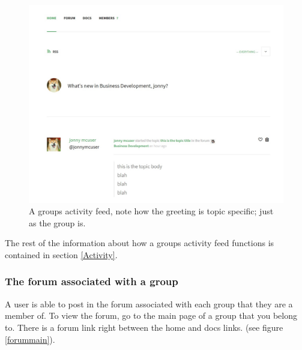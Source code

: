 \documentclass[10pt]{article}
\begin{document}
\begin{figure}[H]
    \centering
    \includegraphics[scale=0.5]{images/groupactivity.jpg}
    \caption{A groups activity feed, note how the greeting is topic specific; just as the group is.}
    \label{groupact}
\end{figure}

\begin{flushleft}
The rest of the information about how a groups activity feed functions is contained in section \ref{Activity}.
\end{flushleft}

\subsubsection{The forum associated with a group} \label{groupforum}

\begin{flushleft}
A user is able to post in the forum associated with each group that they are a member of.  To view the forum, go to the main page of a group that you belong to.  There is a forum link right between the home and docs links.  (see figure \ref{forummain}).
\end{flushleft}
\end{document}
